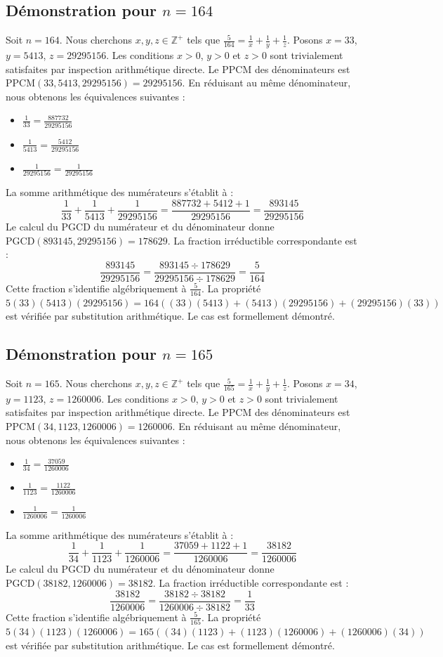 \documentclass[12pt,a4paper]{article}
\begin{document}
\subsection{Démonstration pour $n = 164$}
Soit $n = 164$. Nous cherchons $x, y, z \in \mathbb{Z}^{+}$ tels que $\frac{5}{164} = \frac{1}{x} + \frac{1}{y} + \frac{1}{z}$.
Posons $x = 33$, $y = 5413$, $z = 29295156$.
Les conditions $x > 0$, $y > 0$ et $z > 0$ sont trivialement satisfaites par inspection arithmétique directe.
Le PPCM des dénominateurs est $\text{PPCM}(33, 5413, 29295156) = 29295156$.
En réduisant au même dénominateur, nous obtenons les équivalences suivantes :
\begin{itemize}
    \item $\frac{1}{33} = \frac{887732}{29295156}$
    \item $\frac{1}{5413} = \frac{5412}{29295156}$
    \item $\frac{1}{29295156} = \frac{1}{29295156}$
\end{itemize}
La somme arithmétique des numérateurs s'établit à :
$$ \frac{1}{33} + \frac{1}{5413} + \frac{1}{29295156} = \frac{887732 + 5412 + 1}{29295156} = \frac{893145}{29295156} $$
Le calcul du PGCD du numérateur et du dénominateur donne $\text{PGCD}(893145, 29295156) = 178629$.
La fraction irréductible correspondante est :
$$ \frac{893145}{29295156} = \frac{893145 \div 178629}{29295156 \div 178629} = \frac{5}{164} $$
Cette fraction s'identifie algébriquement à $\frac{5}{164}$.
La propriété $5(33)(5413)(29295156) = 164((33)(5413) + (5413)(29295156) + (29295156)(33))$ est vérifiée par substitution arithmétique.
Le cas est formellement démontré.

\subsection{Démonstration pour $n = 165$}
Soit $n = 165$. Nous cherchons $x, y, z \in \mathbb{Z}^{+}$ tels que $\frac{5}{165} = \frac{1}{x} + \frac{1}{y} + \frac{1}{z}$.
Posons $x = 34$, $y = 1123$, $z = 1260006$.
Les conditions $x > 0$, $y > 0$ et $z > 0$ sont trivialement satisfaites par inspection arithmétique directe.
Le PPCM des dénominateurs est $\text{PPCM}(34, 1123, 1260006) = 1260006$.
En réduisant au même dénominateur, nous obtenons les équivalences suivantes :
\begin{itemize}
    \item $\frac{1}{34} = \frac{37059}{1260006}$
    \item $\frac{1}{1123} = \frac{1122}{1260006}$
    \item $\frac{1}{1260006} = \frac{1}{1260006}$
\end{itemize}
La somme arithmétique des numérateurs s'établit à :
$$ \frac{1}{34} + \frac{1}{1123} + \frac{1}{1260006} = \frac{37059 + 1122 + 1}{1260006} = \frac{38182}{1260006} $$
Le calcul du PGCD du numérateur et du dénominateur donne $\text{PGCD}(38182, 1260006) = 38182$.
La fraction irréductible correspondante est :
$$ \frac{38182}{1260006} = \frac{38182 \div 38182}{1260006 \div 38182} = \frac{1}{33} $$
Cette fraction s'identifie algébriquement à $\frac{5}{165}$.
La propriété $5(34)(1123)(1260006) = 165((34)(1123) + (1123)(1260006) + (1260006)(34))$ est vérifiée par substitution arithmétique.
Le cas est formellement démontré.
\end{document}
